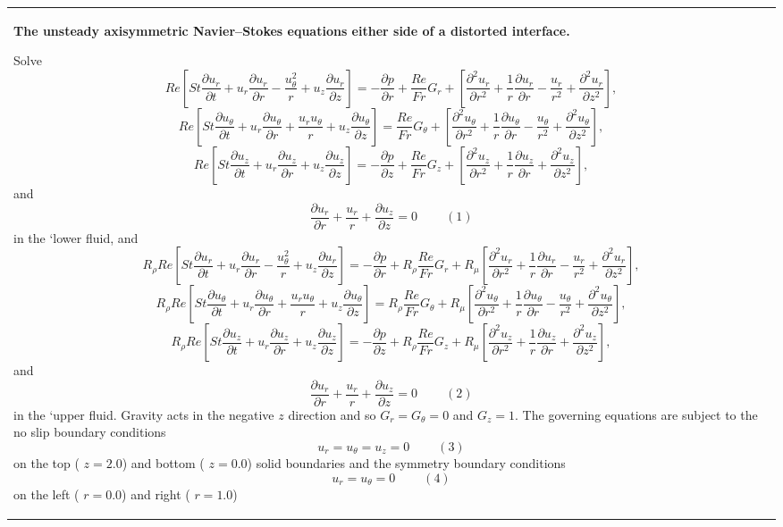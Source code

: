 \begin{center} \tabulinesep=1mm
\begin{longtabu} spread 0pt [c]{*{1}{|X[-1]}|}
\hline
\begin{center} {\bfseries  The unsteady axisymmetric Navier--Stokes equations either side of a distorted interface.} \end{center}  Solve \[ Re \left[ St \frac{\partial u_r}{\partial t} + u_r \frac{\partial u_r}{\partial r} - \frac{u_\theta^2}{r} + u_z \frac{\partial u_r}{\partial z} \right] = -\frac{\partial p}{\partial r} + \frac{Re}{Fr} G_r + \left[ \frac{\partial^2 u_r}{\partial r^2} + \frac{1}{r}\frac{\partial u_r}{\partial r} - \frac{u_r}{r^2} + \frac{\partial^2 u_r}{\partial z^2} \right], \] \[ Re \left[ St \frac{\partial u_\theta}{\partial t} + u_r \frac{\partial u_\theta}{\partial r} + \frac{u_r u_\theta}{r} + u_z \frac{\partial u_\theta}{\partial z} \right] = \frac{Re}{Fr} G_\theta + \left[ \frac{\partial^2 u_\theta}{\partial r^2} + \frac{1}{r}\frac{\partial u_\theta}{\partial r} - \frac{u_\theta}{r^2} + \frac{\partial^2 u_\theta}{\partial z^2} \right], \] \[ Re \left[ St \frac{\partial u_z}{\partial t} + u_r \frac{\partial u_z}{\partial r} + u_z \frac{\partial u_z}{\partial z} \right] = -\frac{\partial p}{\partial z} + \frac{Re}{Fr} G_z + \left[ \frac{\partial^2 u_z}{\partial r^2} + \frac{1}{r}\frac{\partial u_z}{\partial r} + \frac{\partial^2 u_z}{\partial z^2} \right], \] and \[ \frac{\partial u_r}{\partial r} + \frac{u_r}{r} + \frac{\partial u_z}{\partial z} = 0 \ \ \ \ \ \ \ \ \ \ (1) \] in the `lower\textquotesingle{} fluid, and \[ R_\rho Re \left[ St \frac{\partial u_r}{\partial t} + u_r \frac{\partial u_r}{\partial r} - \frac{u_\theta^2}{r} + u_z \frac{\partial u_r}{\partial z} \right] = -\frac{\partial p}{\partial r} + R_\rho \frac{Re}{Fr} G_r + R_\mu \left[ \frac{\partial^2 u_r}{\partial r^2} + \frac{1}{r}\frac{\partial u_r}{\partial r} - \frac{u_r}{r^2} + \frac{\partial^2 u_r}{\partial z^2} \right], \] \[ R_\rho Re \left[ St \frac{\partial u_\theta}{\partial t} + u_r \frac{\partial u_\theta}{\partial r} + \frac{u_r u_\theta}{r} + u_z \frac{\partial u_\theta}{\partial z} \right] = R_\rho \frac{Re}{Fr} G_\theta + R_\mu \left[ \frac{\partial^2 u_\theta}{\partial r^2} + \frac{1}{r}\frac{\partial u_\theta}{\partial r} - \frac{u_\theta}{r^2} + \frac{\partial^2 u_\theta}{\partial z^2} \right], \] \[ R_\rho Re \left[ St \frac{\partial u_z}{\partial t} + u_r \frac{\partial u_z}{\partial r} + u_z \frac{\partial u_z}{\partial z} \right] = -\frac{\partial p}{\partial z} + R_\rho \frac{Re}{Fr} G_z + R_\mu \left[ \frac{\partial^2 u_z}{\partial r^2} + \frac{1}{r}\frac{\partial u_z}{\partial r} + \frac{\partial^2 u_z}{\partial z^2} \right], \] and \[ \frac{\partial u_r}{\partial r} + \frac{u_r}{r} + \frac{\partial u_z}{\partial z} = 0 \ \ \ \ \ \ \ \ \ \ (2) \] in the `upper\textquotesingle{} fluid. Gravity acts in the negative $ z $ direction and so $ G_r = G_\theta = 0 $ and $ G_z = 1 $. The governing equations are subject to the no slip boundary conditions \[ u_r = u_\theta = u_z = 0 \ \ \ \ \ \ \ \ \ \ (3) \] on the top ( $ z = 2.0 $) and bottom ( $ z = 0.0 $) solid boundaries and the symmetry boundary conditions \[ u_r = u_\theta = 0 \ \ \ \ \ \ \ \ \ \ (4) \] on the left ( $ r = 0.0 $) and right ( $ r = 1.0 $) 
\end{longtabu}
\end{center}
